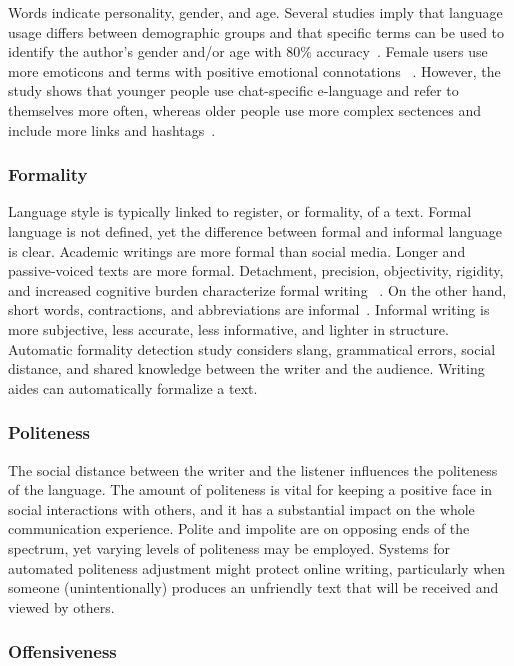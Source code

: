 \documentclass[akbc,twoside,11pt]{article}
\begin{document}
Words indicate personality, gender, and age. Several studies imply that language usage differs between demographic groups and that specific terms can be used to identify the author's gender and/or age with 80\% accuracy~\cite{koppel2001automatically}. Female users use more emoticons and terms with positive emotional connotations ~\cite{rao2010classifying}. However, the study shows that younger people use chat-specific e-language and refer to themselves more often, whereas older people use more complex sectences and include more links and hashtags~\cite{nguyen2013old}.

\subsubsection{Formality}

Language style is typically linked to register, or formality, of a text. Formal language is not defined, yet the difference between formal and informal language is clear. Academic writings are more formal than social media. Longer and passive-voiced texts are more formal. Detachment, precision, objectivity, rigidity, and increased cognitive burden characterize formal writing~\cite{sheikha2010automatic} . On the other hand, short words, contractions, and abbreviations are informal~\cite{sheikha2010automatic}. Informal writing is more subjective, less accurate, less informative, and lighter in structure. Automatic formality detection study considers slang, grammatical errors, social distance, and shared knowledge between the writer and the audience. Writing aides can automatically formalize a text.

\subsubsection{Politeness}

The social distance between the writer and the listener influences the politeness of the language. The amount of politeness is vital for keeping a positive face in social interactions with others, and it has a substantial impact on the whole communication experience. Polite and impolite are on opposing ends of the spectrum, yet varying levels of politeness may be employed. Systems for automated politeness adjustment might protect online writing, particularly when someone (unintentionally) produces an unfriendly text that will be received and viewed by others.

\subsubsection{Offensiveness}
\end{document}
